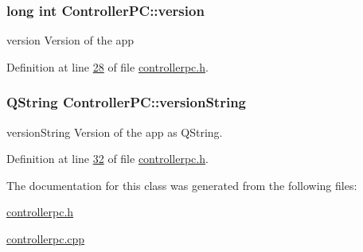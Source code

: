 \subsubsection[{\texorpdfstring{version}{version}}]{\setlength{\rightskip}{0pt plus 5cm}long int Controller\+P\+C\+::version}\hypertarget{class_controller_p_c_a9eb43c34237d66751a6411e55cf5f55e}{}\label{class_controller_p_c_a9eb43c34237d66751a6411e55cf5f55e}


version Version of the app 



Definition at line \hyperlink{controllerpc_8h_source_l00028}{28} of file \hyperlink{controllerpc_8h_source}{controllerpc.\+h}.

\subsubsection[{\texorpdfstring{version\+String}{versionString}}]{\setlength{\rightskip}{0pt plus 5cm}Q\+String Controller\+P\+C\+::version\+String}\hypertarget{class_controller_p_c_a0e63cca37d6ce2e660f3380400c2c5f3}{}\label{class_controller_p_c_a0e63cca37d6ce2e660f3380400c2c5f3}


version\+String Version of the app as Q\+String. 



Definition at line \hyperlink{controllerpc_8h_source_l00032}{32} of file \hyperlink{controllerpc_8h_source}{controllerpc.\+h}.



The documentation for this class was generated from the following files\+:\begin{DoxyCompactItemize}
\item 
\hyperlink{controllerpc_8h}{controllerpc.\+h}\item 
\hyperlink{controllerpc_8cpp}{controllerpc.\+cpp}\end{DoxyCompactItemize}
